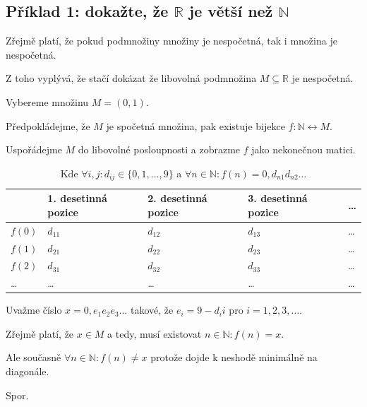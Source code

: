 \subsection*{Příklad 1: dokažte, že $\mathbb{R}$ je větší než $\mathbb{N}$}

\begin{compactitem}
    \item Zřejmě platí, že pokud podmnožiny množiny je nespočetná, tak i množina je nespočetná. \begin{compactitem}
        \item Z toho vyplývá, že stačí dokázat že libovolná podmnožina $M \subseteq \mathbb{R}$ je nespočetná.
        \item Vybereme množinu $M = (0, 1)$.
    \end{compactitem}

    \item Předpokládejme, že $M$ je spočetná množina, pak existuje bijekce $f : \mathbb{N} \leftrightarrow M$.

    \item Uspořádejme $M$ do libovolné posloupnosti a zobrazme $f$ jako nekonečnou matici.

    \begin{table}[H]
        \begin{tabular}{l|llll}
                   & 1. desetinná pozice & 2. desetinná pozice & 3. desetinná pozice & \dots \\ \hline
            $f(0)$ & $d_{11}$            & $d_{12}$            & $d_{13}$            & \dots \\
            $f(1)$ & $d_{21}$            & $d_{22}$            & $d_{23}$            & \dots \\
            $f(2)$ & $d_{31}$            & $d_{32}$            & $d_{33}$            & \dots \\
            \dots  & \dots               & \dots               & \dots               & \dots \\
        \end{tabular}
        \caption*{Kde $\forall i,j : d_{ij} \in \{ 0, 1, \dots, 9 \}$ a $\forall n \in \mathbb{N} : f(n) = 0, d_{n1} d_{n2} \dots$}
    \end{table}

    \item Uvažme číslo $x = 0, e_1 e_2 e_3 \dots$ takové, že $e_i = 9 - d_ii$ pro $i = 1, 2, 3, \dots$.

    \item Zřejmě platí, že $x \in M$ a tedy, musí existovat $n \in \mathbb{N} : f(n) = x$.

    \item Ale současně $\forall n \in \mathbb{N} : f(n) \not= x$ protože dojde k neshodě minimálně na diagonále. \begin{compactitem}
        \item Spor.
    \end{compactitem}
\end{compactitem}

